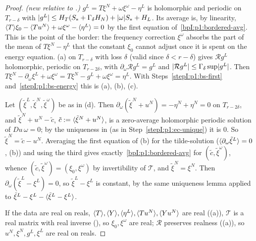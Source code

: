 \begin{proof}
\label{stepI:p1:bs-second}
\emph{(new relative to .)} $g^L=T\xi^N+\omega\xi^\omega-\eta^L$ is holomorphic and periodic on $T_{r-\delta}$ with
$\lvert g^L\rvert\le H_T(S_*+\Gamma_\delta H_N)+\lvert \omega\rvert S_*+H_L$. Its average is, by linearity,
$\langle T\rangle\xi_0-\langle Tu^N\rangle+\omega\xi^\omega-\langle \eta^L\rangle=0$ by the first equation of~\eqref{bpI:p1:bordered-avg}. This is the point
of the border: the frequency correction $\xi^\omega$ absorbs the part of the mean of $T\xi^N-\eta^L$ that the constant $\xi_0$ cannot
adjust once it is spent on the energy equation. (a) on $T_{r-\delta}$ with loss $\delta$ (valid since $\delta<r-\delta$) gives
$\mathcal Rg^L$ holomorphic, periodic on $T_{r-2\delta}$, with $\partial_\omega\mathcal Rg^L=g^L$ and $\lvert \mathcal Rg^L\rvert\le\Gamma_\delta\sup\lvert g^L\rvert$. Then
$T\xi^N-\partial_\omega\xi^L+\omega\xi^\omega=T\xi^N-g^L+\omega\xi^\omega=\eta^L$. With Steps~\ref{stepI:p1:bs-first} and~\ref{stepI:p1:bs-energy} this is (a), (b), (c).

\label{stepI:p1:bs-unique}
Let $(\tilde\xi^L,\tilde\xi^N,\tilde\xi^\omega)$ be as in (d). Then $\partial_\omega(\tilde\xi^N+u^N)=-\eta^N+\eta^N=0$ on $T_{r-2\delta}$, and
$\tilde\xi^N+u^N-\tilde c$, $\tilde c:=\langle \tilde\xi^N+u^N\rangle$, is a zero-average holomorphic periodic solution of $Du\,\omega=0$; by the
uniqueness in  (as in Step~\ref{stepI:p1:ec-unique}) it is $0$. So $\tilde\xi^N=\tilde c-u^N$. Averaging the first equation of (b) for the tilde-solution
($\langle \partial_\omega\tilde\xi^L\rangle=0$, (b)) and using the third gives exactly~\eqref{bpI:p1:bordered-avg} for $(\tilde c,\tilde\xi^\omega)$, whence
$(\tilde c,\tilde\xi^\omega)=(\xi_0,\xi^\omega)$ by invertibility of $\mathcal T$, and $\tilde\xi^N=\xi^N$. Then $\partial_\omega(\tilde\xi^L-\xi^L)=0$, so
$\tilde\xi^L-\xi^L$ is constant, by the same uniqueness lemma applied to $\tilde\xi^L-\xi^L-\langle \tilde\xi^L-\xi^L\rangle$.

\label{stepI:p1:bs-real}
If the data are real on reals, $\langle T\rangle,\langle Y\rangle,\langle \eta^L\rangle,\langle Tu^N\rangle,\langle Yu^N\rangle$ are real ((a)), $\mathcal T$ is a real
matrix with real inverse (), so $\xi_0,\xi^\omega$ are real; $\mathcal R$ preserves realness
((a)), so $u^N,\xi^N,g^L,\xi^L$ are real on reals.
\end{proof}

